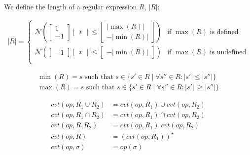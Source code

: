 We define the length of a regular expression $R$, $|R|$:

\begin{align}
    |R| = \begin{cases}
        \mathcal{N} \left(
            \begin{bmatrix}
                1 \\
                -1
            \end{bmatrix}
            \begin{bmatrix}
               x
            \end{bmatrix}
            \leq
            \begin{bmatrix}
                |\max(R)| \\
                -|\min(R)|
            \end{bmatrix}
        \right) & \text{if $\max(R)$ is defined} \\
        \mathcal{N} \left(
            \begin{bmatrix}
                -1
            \end{bmatrix}
            \begin{bmatrix}
               x
            \end{bmatrix}
            \leq
            \begin{bmatrix}
                -|\min(R)|
            \end{bmatrix}
        \right) & \text{if $\max(R)$ is undefined} \\
    \end{cases}
\end{align}

\begin{align}
    \min(R) = s \text{ such that } s \in \{ s' \in R \mid \forall s'' \in R : |s'| \leq |s''| \} \\
    \max(R) = s \text{ such that } s \in \{ s' \in R \mid \forall s'' \in R : |s'| \ \geq |s''| \}
\end{align}

\begin{align}
    cvt(op, R_1 \cup R_2) &= cvt(op, R_1) \cup cvt(op, R_2) \\
    cvt(op, R_1 \cap R_2) &= cvt(op, R_1) \cap cvt(op, R_2) \\
    cvt(op, R_1R_2) &= cvt(op, R_1) \; cvt(op, R_2) \\
    cvt(op, R) &= (cvt(op, R_1))^\star \\
    cvt(op, \sigma) &= op(\sigma)
\end{align}

